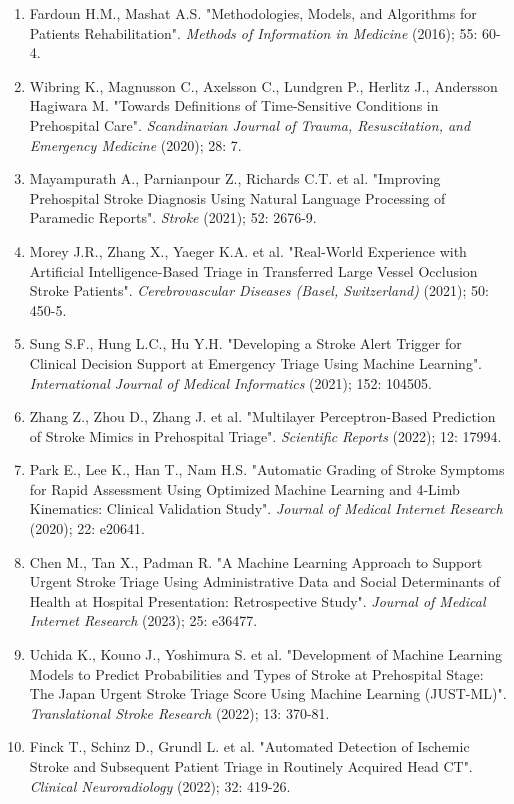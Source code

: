 {{\begin{enumerate}
    \item Fardoun H.M., Mashat A.S. "Methodologies, Models, and Algorithms for Patients Rehabilitation". \textit{Methods of Information in Medicine} (2016); 55: 60-4.
    \item Wibring K., Magnusson C., Axelsson C., Lundgren P., Herlitz J., Andersson Hagiwara M. "Towards Definitions of Time-Sensitive Conditions in Prehospital Care". \textit{Scandinavian Journal of Trauma, Resuscitation, and Emergency Medicine} (2020); 28: 7.
    \item Mayampurath A., Parnianpour Z., Richards C.T. et al. "Improving Prehospital Stroke Diagnosis Using Natural Language Processing of Paramedic Reports". \textit{Stroke} (2021); 52: 2676-9.
    \item Morey J.R., Zhang X., Yaeger K.A. et al. "Real-World Experience with Artificial Intelligence-Based Triage in Transferred Large Vessel Occlusion Stroke Patients". \textit{Cerebrovascular Diseases (Basel, Switzerland)} (2021); 50: 450-5.
    \item Sung S.F., Hung L.C., Hu Y.H. "Developing a Stroke Alert Trigger for Clinical Decision Support at Emergency Triage Using Machine Learning". \textit{International Journal of Medical Informatics} (2021); 152: 104505.
    \item Zhang Z., Zhou D., Zhang J. et al. "Multilayer Perceptron-Based Prediction of Stroke Mimics in Prehospital Triage". \textit{Scientific Reports} (2022); 12: 17994.
    \item Park E., Lee K., Han T., Nam H.S. "Automatic Grading of Stroke Symptoms for Rapid Assessment Using Optimized Machine Learning and 4-Limb Kinematics: Clinical Validation Study". \textit{Journal of Medical Internet Research} (2020); 22: e20641.
    \item Chen M., Tan X., Padman R. "A Machine Learning Approach to Support Urgent Stroke Triage Using Administrative Data and Social Determinants of Health at Hospital Presentation: Retrospective Study". \textit{Journal of Medical Internet Research} (2023); 25: e36477.
    \item Uchida K., Kouno J., Yoshimura S. et al. "Development of Machine Learning Models to Predict Probabilities and Types of Stroke at Prehospital Stage: The Japan Urgent Stroke Triage Score Using Machine Learning (JUST-ML)". \textit{Translational Stroke Research} (2022); 13: 370-81.
    \item Finck T., Schinz D., Grundl L. et al. "Automated Detection of Ischemic Stroke and Subsequent Patient Triage in Routinely Acquired Head CT". \textit{Clinical Neuroradiology} (2022); 32: 419-26.

\end{enumerate}}}
